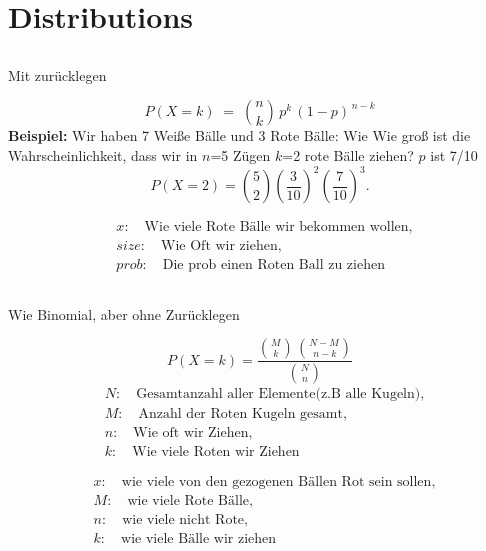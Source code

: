 \section{Distributions}

\subsection*{\centering{}}
\begin{center}
\textcolor{red}{\warning}\textcolor{red}{\warning} Mit zurücklegen \textcolor{red}{\warning}\textcolor{red}{\warning}
\end{center}
\[ 
P(X = k) \;=\; \binom{n}{k}\,p^k\,(1-p)^{\,n-k} 
\]
\large{\textbf{Beispiel:}}
\normalsize
Wir haben 7 Weiße Bälle und 3 Rote Bälle:
Wie Wie groß ist die Wahrscheinlichkeit, dass wir in $n$=5 Zügen $k$=2 rote Bälle ziehen? $p$ ist 7/10
\[
P(X = 2) = \binom{5}{2} \left(\frac{3}{10}\right)^2 \left(\frac{7}{10}\right)^3.
\]
\[
    \begin{aligned}
    &x:\quad \text{Wie viele Rote Bälle wir bekommen wollen},\\
    &size:\quad \text{Wie Oft wir ziehen},\\
    &prob:\quad \text{Die prob einen Roten Ball zu ziehen}
    \end{aligned}
\]
\subsection*{\centering{}}
\begin{center}
\textcolor{red}{\warning}\textcolor{red}{\warning} Wie Binomial, aber ohne Zurücklegen \textcolor{red}{\warning}\textcolor{red}{\warning}
\end{center}
\[
P(X = k) 
= \frac{\binom{M}{k}\,\binom{N - M}{\,n - k}}{\binom{N}{n}}
\]
\normalsize
\[
\begin{aligned}
&N:\quad \text{Gesamtanzahl aller Elemente(z.B alle Kugeln)},\\
&M:\quad \text{Anzahl der Roten Kugeln gesamt},\\
&n:\quad \text{Wie oft wir Ziehen},\\
&k:\quad \text{Wie viele Roten wir Ziehen}
\end{aligned}
\]
\normalsize
\[
\begin{aligned}
&x:\quad \text{wie viele von den gezogenen Bällen Rot sein sollen},\\
&M:\quad \text{wie viele Rote Bälle},\\
&n:\quad \text{wie viele nicht Rote},\\
&k:\quad \text{wie viele Bälle wir ziehen}
\end{aligned}
\]
\columnbreak
